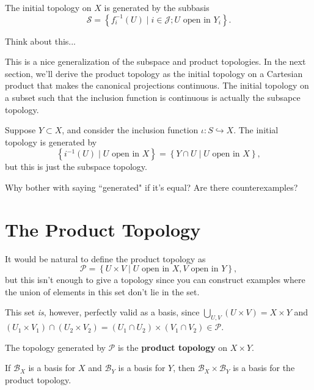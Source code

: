 \documentclass[10pt]{report}
\begin{document}
\begin{prop}
The initial topology on $X$ is generated by the subbasis
\[
	\mathcal{S} = \left\{ f_i^{-1}(U) \;|\; i \in \mathcal{J}; U \text{ open in } Y_i \right\}.
\]
\end{prop}
{\color{red}Think about this...}

This is a nice generalization of the subspace and product topologies. In the next section, we'll derive the product topology as the initial topology on a Cartesian product that makes the canonical projections continuous. The initial topology on a subset such that the inclusion function is continuous is actually the subsapce topology.

\begin{ex}[]
	Suppose $Y \subset X$, and consider the inclusion function $\iota:S \hookrightarrow X$. The initial topology is generated by
	\[
		\left\{ i^{-1}(U) \;|\; U \text{ open in } X \right\} = \left\{ Y \cap U \;|\; U \text{ open in } X \right\},
	\] but this is just the subspace topology.

	{\color{red}Why bother with saying ``generated" if it's equal? Are there counterexamples?}
\end{ex}



\section{The Product Topology}

It would be natural to define the product topology as
\[
	\mathcal{P}= \left\{ U \times V \;|\; U \text{ open in } X, V \text{ open in } Y \right\},
\]but this isn't enough to give a topology since you can construct examples where the union of elements in this set don't lie in the set.

This set \textit{is}, however, perfectly valid as a basis, since $\bigcup_{U,V}(U\times V)=X\times Y$ and $(U_1 \times V_1) \cap (U_2 \times V_2) = (U_1 \cap U_2) \times (V_1 \cap V_2) \in \mathcal{P}$.

\begin{defn}[]
The topology generated by $\mathcal{P}$ is the \textbf{product topology} on $X \times Y$.
\end{defn}

\begin{prop}
If $\mathcal{B}_X$ is a basis for $X$ and $\mathcal{B}_Y$ is a basis for $Y$, then $\mathcal{B}_X \times \mathcal{B}_Y$ is a basis for the product topology.
\end{prop}
\end{document}
